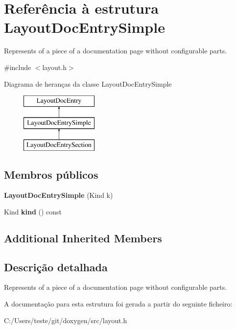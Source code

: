 \hypertarget{struct_layout_doc_entry_simple}{\section{Referência à estrutura Layout\-Doc\-Entry\-Simple}
\label{struct_layout_doc_entry_simple}
}


Represents of a piece of a documentation page without configurable parts.  




{\ttfamily \#include $<$layout.\-h$>$}

Diagrama de heranças da classe Layout\-Doc\-Entry\-Simple\begin{figure}[H]
\begin{center}
\leavevmode
\includegraphics[height=3.000000cm]{struct_layout_doc_entry_simple}
\end{center}
\end{figure}
\subsection*{Membros públicos}
\begin{DoxyCompactItemize}
\item 
\hypertarget{struct_layout_doc_entry_simple_a4dbfd6b0b79bf64e78e1fb9758da6bf8}{{\bfseries Layout\-Doc\-Entry\-Simple} (Kind k)}\label{struct_layout_doc_entry_simple_a4dbfd6b0b79bf64e78e1fb9758da6bf8}

\item 
\hypertarget{struct_layout_doc_entry_simple_aa9d037bed9f9a083d0cd01485637d843}{Kind {\bfseries kind} () const }\label{struct_layout_doc_entry_simple_aa9d037bed9f9a083d0cd01485637d843}

\end{DoxyCompactItemize}
\subsection*{Additional Inherited Members}


\subsection{Descrição detalhada}
Represents of a piece of a documentation page without configurable parts. 

A documentação para esta estrutura foi gerada a partir do seguinte ficheiro\-:\begin{DoxyCompactItemize}
\item 
C\-:/\-Users/teste/git/doxygen/src/layout.\-h\end{DoxyCompactItemize}
